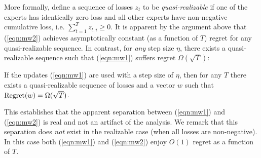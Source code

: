 \documentclass[paper_icml.tex]{subfiles}
\begin{document}
More formally, define a sequence of losses $z_t$ to be \emph{quasi-realizable} 
if one of the experts has identically zero loss and all other experts 
have non-negative cumulative loss, i.e. $\sum_{t=1}^T z_{t,i} \geq 0$. It is 
apparent by the argument above that (\ref{eqn:mw2}) achieves asymptotically 
constant (as a function of $T$) regret for any quasi-realizable sequence. In 
contrast, for \emph{any} step size $\eta$, there exists a quasi-realizable 
sequence such that (\ref{eqn:mw1}) suffers regret $\Omega(\sqrt{T})$:
\begin{proposition}
\label{prop:separation}
If the updates (\ref{eqn:mw1}) are used with a step size of $\eta$, then for 
any $T$ there exists a quasi-realizable sequence of losses and a vector $w$ 
such that $\operatorname{Regret}(w) = \Omega(\sqrt{T})$.
\end{proposition}
This establishes that the apparent separation between (\ref{eqn:mw1}) and 
(\ref{eqn:mw2}) is real and not an artifact of the analysis. We remark that 
this separation does \emph{not} exist in the realizable case (when all losses 
are non-negative). In this case both (\ref{eqn:mw1}) and (\ref{eqn:mw2}) enjoy 
$O(1)$ regret as a function of $T$.
\end{document}
